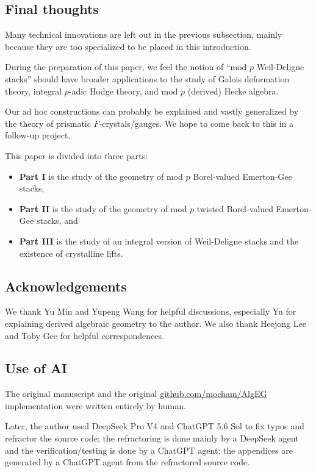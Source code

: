 \documentclass[11pt]{amsart}
\newcommand{\MINOREDITED}[1]{#1}
\theoremstyle{definition}
\begin{document}
\subsection{Final thoughts}

Many technical innovations
are left out in the previous subsection,
mainly because they are too specialized
to be placed in this introduction.

During the preparation of this paper,
we feel the notion of ``mod $p$ Weil-Deligne stacks''
should have broader applications
to the study of Galois deformation theory,
integral $p$-adic Hodge theory,
and mod $p$ (derived) Hecke algebra.

Our ad hoc constructions can probably be explained and
vastly generalized by the
theory of prismatic $F$-crystals/gauges.
We hope to come back to this in a follow-up project.

This paper is divided into three parts:

\begin{itemize}
\item {\bf Part I} is the study of the geometry of mod $p$ 
Borel-valued Emerton-Gee stacks,

\item {\bf Part II} is the study of the geometry of mod $p$ 
twisted
Borel-valued Emerton-Gee stacks, and

\item {\bf Part III} is the study of an integral version
of Weil-Deligne stacks and the existence of crystalline lifts.
\end{itemize}

\subsection{\MINOREDITED{Acknowledgements}}
We thank Yu Min and Yupeng Wang for helpful discussions,
especially Yu for explaining derived algebraic geometry
to the author.
We also thank Heejong Lee and Toby Gee for helpful correspondences.

\subsection{Use of AI}
The original manuscript and the original 
\url{github.com/mocham/AlgEG} implementation
were written entirely by human.

Later, the author used 
DeepSeek Pro V4 and
ChatGPT 5.6 Sol to fix typos
and refractor the source code;
the refractoring is done mainly by a DeepSeek agent
and the verification/testing is done by a ChatGPT agent;
the appendices are generated by a ChatGPT agent from the refractored
source code.
\end{document}
